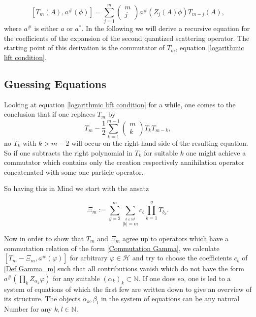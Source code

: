 \documentclass[b5paper,draft,openbib,12pt]{memoir}
\begin{document}
\begin{equation}\label{logarithmic lift condition}
\left[T_m(A) , a^\# (\phi)\right]= \sum_{j=1}^{m} \begin{pmatrix} m \\ j \end{pmatrix} a^\# \left(Z_j (A) \phi \right) T_{m-j}(A), 
\end{equation}
where \(a^\#\) is either \(a\) or \(a^*\).
In the following we will derive a recursive equation for the coefficients of the expansion 
of the second quantized scattering operator. The starting point of this derivation is 
the commutator of \(T_m\), equation \eqref{logarithmic lift condition}.

\subsection{Guessing Equations}

Looking at equation \eqref{logarithmic lift condition} for a while, one
comes to the conclusion that if one replaces \(T_m\) by 
\begin{equation}
T_m - \frac{1}{2} \sum_{k=1}^{m-1} \begin{pmatrix} m \\ k\end{pmatrix} T_k T_{m-k},
\end{equation}
no \(T_k\) with \(k>m-2\) will occur on the right hand side of the resulting equation.
So if one subtracts the right polynomial in \(T_k\) for suitable \(k\) one might achieve
a commutator which contains only the creation respectively annihilation operator 
concatenated with some one particle operator.

So having this in Mind we start with the ansatz

\begin{equation}\label{Def Gamma_m}
\Xi_m := \sum_{g=2}^m \sum_{\stackrel{b\in\mathbb{N}^g}{|b|=m}} c_{b} \prod_{k=1}^g T_{b_k}.
\end{equation}

Now in order to show that \(T_m\) and \(\Xi_m\) agree up to operators which have a commutation 
relation of the form \eqref{Commutation Gamma}, we calculate \(\left[ T_m-\Xi_m, a^\#(\varphi) \right]\)
for arbitrary \(\varphi\in\mathcal{H}\) and try to choose the coefficients \(c_b\) of \eqref{Def Gamma_m}
such that all contributions vanish which do not have the form \(a^\# \left( \prod_k Z_{\alpha_k}\varphi\right)\)
for any suitable \((\alpha_k)_k\subset \mathbb{N} \). If one does so, one is led to a system of equations
of which the first few are  written down 
to give an overview of its structure. The objects \(\alpha_k, \beta_l\) 
in the system of equations can be any 
natural Number for any \(k,l\in\mathbb{N}\).
\end{document}
